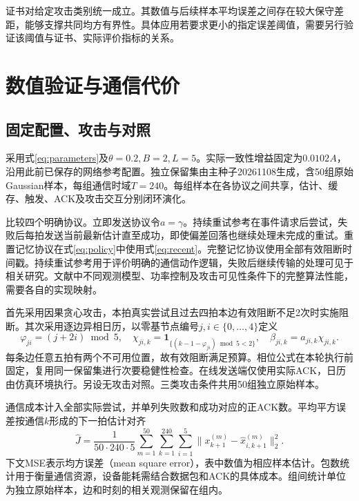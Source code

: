 \documentclass[UTF8,a4paper,zihao=5,fontset=windows]{ctexart}
\newcommand{\ind}{\mathbf 1}
\begin{document}


证书对给定攻击类别统一成立。其数值与后续样本平均误差之间存在较大保守差距，能够支撑共同均方有界性。具体应用若要求更小的指定误差阈值，需要另行验证该阈值与证书、实际评价指标的关系。

\section{数值验证与通信代价}\label{sec:experiments}
\subsection{固定配置、攻击与对照}
采用式\eqref{eq:parameters}及$\theta=0.2,B=2,L=5$。实际一致性增益固定为$0.0102A$，沿用此前已保存的网络参考配置。独立保留集由主种子20261108生成，含50组原始Gaussian样本，每组通信时域$T=240$。每组样本在各协议之间共享，估计、缓存、触发、ACK及攻击交互分别闭环演化。

比较四个明确协议。立即发送协议令$a=\gamma$。持续重试参考在事件请求后尝试，失败后每拍发送当前最新估计直至成功，即使偏差回落也继续处理未完成的重试。重置记忆协议在式\eqref{eq:policy}中使用式\eqref{eq:recent}。完整记忆协议使用全部有效阻断时间戳。持续重试参考用于评价明确的通信动作逻辑，失败后继续传输的处理可见于相关研究\cite{Paper_FUS33_2022}。文献中不同观测模型、功率控制及攻击可见性条件下的完整算法性能，需要各自的实现映射。

首先采用因果贪心攻击，本拍真实尝试且过去四拍本边有效阻断不足2次时实施阻断。其次采用逐边异相日历，以零基节点编号$j,i\in\{0,\ldots,4\}$定义
\begin{equation}
\varphi_{ji}=(j+2i)\bmod5,\quad
\chi_{ji,k}=\ind_{\{(k-1-\varphi_{ji})\bmod5<2\}},\quad
\beta_{ji,k}=a_{ji,k}\chi_{ji,k}.
\label{eq:calendar}
\end{equation}
每条边任意五拍有两个不可用位置，故有效阻断满足预算。相位公式在本轮执行前固定，复用同一保留集进行次要稳健性检查。在线发送端仅使用实际ACK，日历由仿真环境执行。另设无攻击对照。三类攻击条件共用50组独立原始样本。

通信成本计入全部实际尝试，并单列失败数和成功对应的正ACK数。平均平方误差按通信$k$形成的下一拍估计对齐
\begin{equation}
\widehat J=\frac1{50\cdot240\cdot5}
\sum_{m=1}^{50}\sum_{k=1}^{240}\sum_{i=1}^5
\|x_{k+1}^{(m)}-\hat x_{i,k+1}^{(m)}\|_2^2.
\label{eq:metric}
\end{equation}
下文MSE表示均方误差（mean square error），表中数值为相应样本估计。包数统计用于衡量通信资源，设备能耗需结合数据包和ACK的具体成本。组间统计单位为独立原始样本，边和时刻的相关观测保留在组内。
\end{document}
